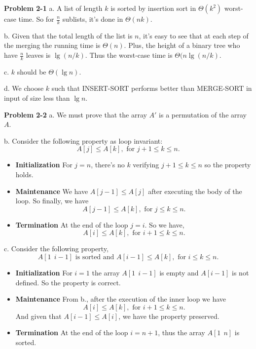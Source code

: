 \documentclass[a4paper,12pt]{article}
\newcommand{\newprob}[1]
{\bigskip \noindent \textbf{Problem #1} \newline}
\newcommand{\subpar}[1]
{\medskip \noindent #1.}
\begin{document}
\newprob{2-1} a. A list of length $k$ is sorted by insertion sort in
$\Theta(k^2)$ worst-case time. So for $\frac{n}{k}$ sublists, it's done in
$\Theta(nk)$.

\subpar{b} Given that the total length of the list is $n$,
it's easy to see that at each step of the merging the running time is
$\Theta(n)$.  Plus, the height of a binary tree who have $\frac{n}{k}$
leaves is $\lg(n/k)$.  Thus the worst-case time is
$\Theta(n \lg(n/k)$.

\subpar{c} $k$ should be $\Theta(\lg n)$.

\subpar{d} We choose $k$ such that INSERT-SORT performs
better than MERGE-SORT in input of size less than $\lg n$.

\newprob{2-2}
\subpar{a} We must prove that the array $A'$ is a permutation of the array
$A$.

\subpar{b} Consider the following property as loop invariant:
\[ A[j] \le A[k], \mbox{ for } j+1 \le k \le n.\]
\begin{itemize}
\item
\textbf{Initialization} For $j = n$, there's no $k$ verifying $j+1 \le
k \le n$ so the property holds.

\item
\textbf{Maintenance} We have $A[j-1] \le A[j]$ after executing the
body of the loop.  So finally, we have
\[ A[j-1] \le A[k], \mbox{ for } j \le k \le n.\]

\item
\textbf{Termination} At the end of the loop $j = i$.  So we have,
\[ A[i] \le A[k], \mbox{ for } i+1 \le k \le n.\]
\end{itemize}

\subpar{c} Consider the following property,
\[ A[1\ \ i-1] \mbox { is sorted and } A[i-1] \le A[k], \mbox{ for }
i \le k \le n.\]

\begin{itemize}
\item
\textbf{Initialization} For $i=1$ the array $A[1\ \ i-1]$ is empty and
$A[i-1]$ is not defined.  So the property is correct.

\item
\textbf{Maintenance} From b., after the execution of the inner loop we
have
\[A[i] \le A[k], \mbox{ for } i+1 \le k \le n.\]
And given that $A[i-1] \le A[i]$, we have the property preserved.

\item
\textbf{Termination} At the end of the loop $i = n+1$, thus the array
$A[1\ \ n]$ is sorted.
\end{itemize}
\end{document}
